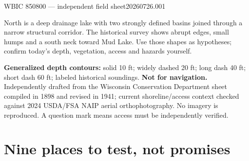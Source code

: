 

  {WBIC 850800 --- independent field sheet}{20260726.001}



North is a deep drainage lake with two strongly defined basins joined through
a narrow structural corridor. The historical survey shows abrupt edges, small
humps and a south neck toward Mud Lake. Use those shapes as hypotheses; confirm
today's depth, vegetation, access and hazards yourself.

\begin{telosfacts}[0.19]
\end{telosfacts}

\begin{center}


\begin{minipage}{.93\linewidth}
\fontsize{8}{9.3}\selectfont
\textbf{Generalized depth contours:} solid 10 ft; widely dashed 20 ft; long dash 40 ft;
short dash 60 ft; labeled historical soundings. \textbf{Not for navigation.}
Independently drafted from the Wisconsin Conservation Department sheet compiled
in 1898 and revised in 1941; current shoreline/access context checked against
2024 USDA/FSA NAIP aerial orthophotography. No imagery is reproduced. A question
mark means access must be independently verified.
\end{minipage}
\end{center}

\newpage
\section{Nine places to test, not promises}


